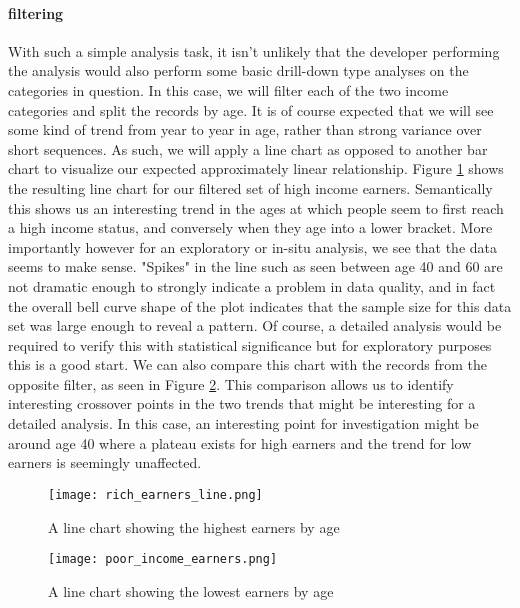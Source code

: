 \paragraph{filtering}
With such a simple analysis task, it isn't unlikely that the developer performing the analysis would also perform some basic drill-down type analyses on the categories in question. In this case, we will filter each of the two income categories and split the records by age. It is of course expected that we will see some kind of trend from year to year in age, rather than strong variance over short sequences. As such, we will apply a line chart as opposed to another bar chart to visualize our expected approximately linear relationship. Figure \ref{fig:rich_line} shows the resulting line chart for our filtered set of high income earners. Semantically this shows us an interesting trend in the ages at which people seem to first reach a high income status, and conversely when they age into a lower bracket. More importantly however for an exploratory or in-situ analysis, we see that the data seems to make sense. "Spikes" in the line such as seen between age 40 and 60 are not dramatic enough to strongly indicate a problem in data quality, and in fact the overall bell curve shape of the plot indicates that the sample size for this data set  was large enough to reveal a pattern. Of course, a detailed analysis would be required to verify this with statistical significance but for exploratory purposes this is a good start. We can also compare this chart with the records from the opposite filter, as seen in Figure \ref{fig:poor_line}. This comparison allows us to identify interesting crossover points in the two trends that might be interesting for a detailed analysis. In this case, an interesting point for investigation might be around age 40 where a plateau exists for high earners and the trend for low earners is seemingly unaffected. 

\begin{figure}
	\centering
	\texttt{[image: rich\_earners\_line.png]}
	\caption{A line chart showing the highest earners by age}
	\label{fig:rich_line}
\end{figure}

\begin{figure}
	\centering
	\texttt{[image: poor\_income\_earners.png]}
	\caption{A line chart showing the lowest earners by age}
	\label{fig:poor_line}
\end{figure}

